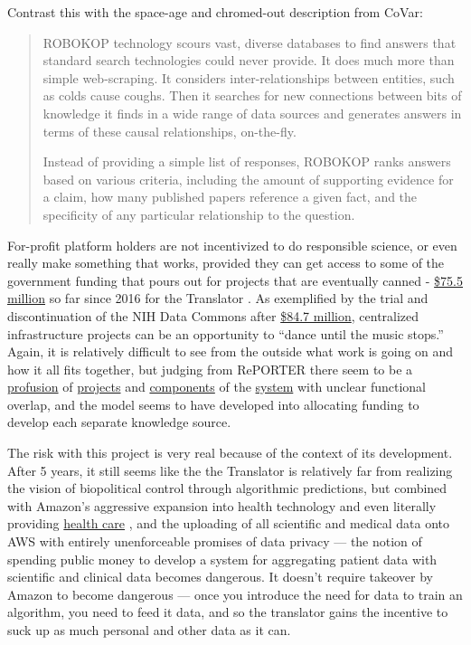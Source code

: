 \documentclass[10pt]{article}
\begin{document}
\begin{multicols}{2}
Contrast this with the space-age and chromed-out description from CoVar:

\begin{quote}
ROBOKOP technology scours vast, diverse databases to find answers that
standard search technologies could never provide. It does much more than
simple web-scraping. It considers inter-relationships between entities,
such as colds cause coughs. Then it searches for new connections between
bits of knowledge it finds in a wide range of data sources and generates
answers in terms of these causal relationships, on-the-fly.

Instead of providing a simple list of responses, ROBOKOP ranks answers
based on various criteria, including the amount of supporting evidence
for a claim, how many published papers reference a given fact, and the
specificity of any particular relationship to the question.
\end{quote}

For-profit platform holders are not incentivized to do responsible
science, or even really make something that works, provided they can get
access to some of the government funding that pours out for projects
that are eventually canned -
\href{https://reporter.nih.gov/search/kDJ97zGUFEaIBIltUmyd_Q/projects?sort_field=FiscalYear\&sort_order=desc}{\$75.5
million} so far since 2016 for the Translator \cite{RePORTRePORTERBiomedical2021} . As exemplified by the trial and
discontinuation of the NIH Data Commons after
\href{https://reporter.nih.gov/search/H4LxgMGK9kGw6SeWCom85Q/projects?shared=true}{\$84.7
million}, centralized infrastructure projects can be an opportunity to
``dance until the music stops.'' Again, it is relatively difficult to
see from the outside what work is going on and how it all fits together,
but judging from RePORTER there seem to be a
\href{https://reporter.nih.gov/project-details/10332268}{profusion} of
\href{https://reporter.nih.gov/project-details/10333468}{projects} and
\href{https://reporter.nih.gov/project-details/10333460}{components} of
the \href{https://reporter.nih.gov/project-details/10330627}{system}
with unclear functional overlap, and the model seems to have developed
into allocating funding to develop each separate knowledge source.

The risk with this project is very real because of the context of its
development. After 5 years, it still seems like the the Translator is
relatively far from realizing the vision of biopolitical control through
algorithmic predictions, but combined with Amazon's aggressive expansion
into health technology \cite{AWSAnnouncesAWS2021}  and even
literally providing \href{https://amazon.care/}{health care} \cite{lermanAmazonBuiltIts2021} , and the uploading of all scientific and
medical data onto AWS with entirely unenforceable promises of data
privacy \cite{quinnYouCanTrust2021}  --- the notion of spending
public money to develop a system for aggregating patient data with
scientific and clinical data becomes dangerous. It doesn't require
takeover by Amazon to become dangerous --- once you introduce the need
for data to train an algorithm, you need to feed it data, and so the
translator gains the incentive to suck up as much personal and other
data as it can.


\end{multicols}
\end{document}
